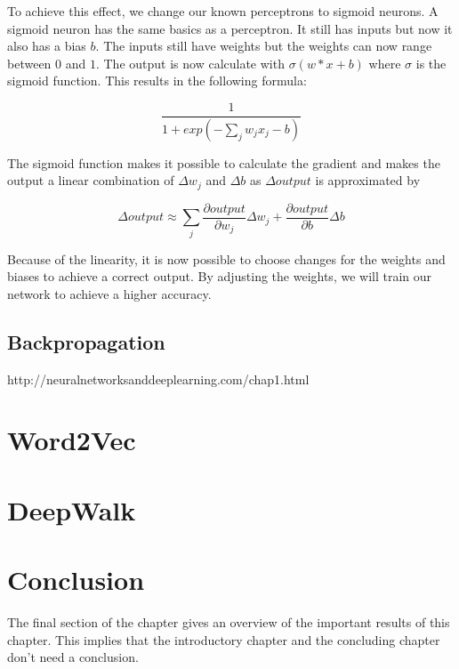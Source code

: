 To achieve this effect, we change our known perceptrons to sigmoid neurons. A sigmoid neuron has the same basics as a perceptron. It still has inputs but now it also has a bias $b$. The inputs still have weights but the weights can now range between $0$ and $1$. The output is now calculate with $\sigma(w*x+b)$ where $\sigma$ is the sigmoid function. This results in the following formula: 

\begin{equation} 
\frac{1}{1+exp(-\sum_j w_jx_j-b)}
\end{equation}

The sigmoid function makes it possible to calculate the gradient and makes the output a linear combination of $\Delta w_j$ and $\Delta b$ as $\Delta output$ is approximated by 

\begin{equation} 
\Delta output \approx \sum_j \frac{\partial output}{\partial w_j}\Delta w_j + \frac{\partial output}{\partial b}\Delta b
\end{equation}

Because of the linearity, it is now possible to choose changes for the weights and biases to achieve a correct output. By adjusting the weights, we will train our network to achieve a higher accuracy.
		
	\subsection{Backpropagation}
	

		

http://neuralnetworksanddeeplearning.com/chap1.html

\section{Word2Vec}
\lipsum[64]

\section{DeepWalk}
\lipsum[64]

\section{Conclusion}
The final section of the chapter gives an overview of the important results
of this chapter. This implies that the introductory chapter and the
concluding chapter don't need a conclusion.

\lipsum[66]

